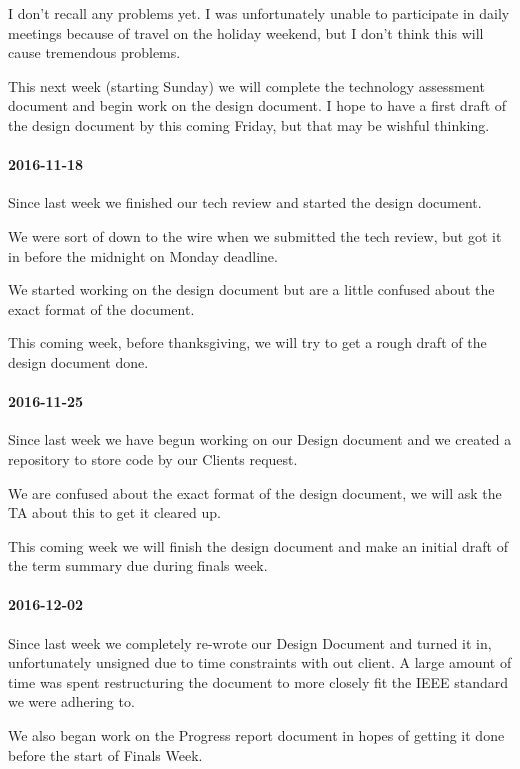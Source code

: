 I don't recall any problems yet.
I was unfortunately unable to participate in daily meetings because of travel on the holiday weekend, but I don't think this will cause tremendous problems.

This next week (starting Sunday) we will complete the technology assessment document and begin work on the design document.
I hope to have a first draft of the design document by this coming Friday, but that may be wishful thinking.

\paragraph{2016-11-18}

Since last week we finished our tech review and started the design document.

We were sort of down to the wire when we submitted the tech review, but got it in before the midnight on Monday deadline.

We started working on the design document but are a little confused about the exact format of the document.

This coming week, before thanksgiving, we will try to get a rough draft of the design document done.

\paragraph{2016-11-25}

Since last week we have begun working on our Design document and we created a repository to store code by our Clients request.

We are confused about the exact format of the design document, we will ask the TA about this to get it cleared up.

This coming week we will finish the design document and make an initial draft of the term summary due during finals week.

\paragraph{2016-12-02}

Since last week we completely re-wrote our Design Document and turned it in, unfortunately unsigned due to time constraints with out client.
A large amount of time was spent restructuring the document to more closely fit the IEEE standard we were adhering to.

We also began work on the Progress report document in hopes of getting it done before the start of Finals Week.


